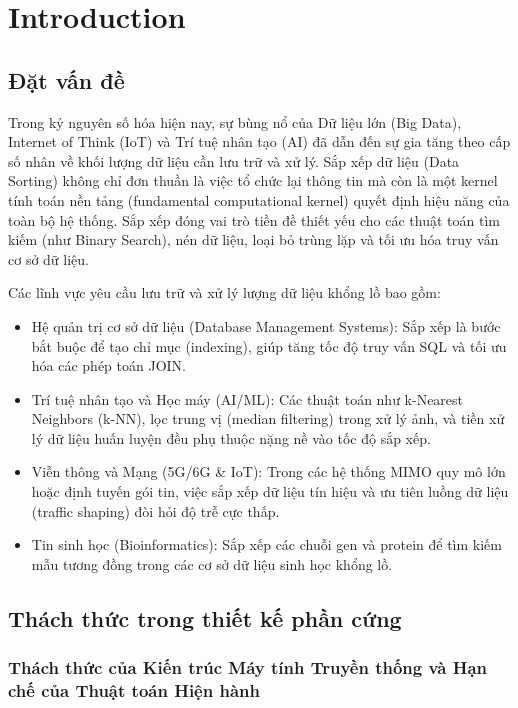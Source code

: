 \section{Introduction}

\subsection{Đặt vấn đề}

Trong kỷ nguyên số hóa hiện nay, sự bùng nổ của Dữ liệu lớn (Big Data), Internet of Think (IoT) và Trí tuệ nhân tạo (AI) đã dẫn đến sự gia tăng theo cấp số nhân về khối lượng dữ liệu cần lưu trữ và xử lý. Sắp xếp dữ liệu (Data Sorting) không chỉ đơn thuần là việc tổ chức lại thông tin mà còn là một kernel tính toán nền tảng (fundamental computational kernel) quyết định hiệu năng của toàn bộ hệ thống. Sắp xếp đóng vai trò tiền đề thiết yếu cho các thuật toán tìm kiếm (như Binary Search), nén dữ liệu, loại bỏ trùng lặp và tối ưu hóa truy vấn cơ sở dữ liệu.

Các lĩnh vực yêu cầu lưu trữ và xử lý lượng dữ liệu khổng lồ bao gồm:
\begin{itemize}[label=-]
	\item Hệ quản trị cơ sở dữ liệu (Database Management Systems): Sắp xếp là bước bắt buộc để tạo chỉ mục (indexing), giúp tăng tốc độ truy vấn SQL và tối ưu hóa các phép toán JOIN.
	
	\item Trí tuệ nhân tạo và Học máy (AI/ML): Các thuật toán như k-Nearest Neighbors (k-NN), lọc trung vị (median filtering) trong xử lý ảnh, và tiền xử lý dữ liệu huấn luyện đều phụ thuộc nặng nề vào tốc độ sắp xếp.
	
	\item Viễn thông và Mạng (5G/6G \& IoT): Trong các hệ thống MIMO quy mô lớn hoặc định tuyến gói tin, việc sắp xếp dữ liệu tín hiệu và ưu tiên luồng dữ liệu (traffic shaping) đòi hỏi độ trễ cực thấp.
	
	\item Tin sinh học (Bioinformatics): Sắp xếp các chuỗi gen và protein để tìm kiếm mẫu tương đồng trong các cơ sở dữ liệu sinh học khổng lồ.
\end{itemize}

\subsection{Thách thức trong thiết kế phần cứng}

\subsubsection{Thách thức của Kiến trúc Máy tính Truyền thống và Hạn chế của Thuật toán Hiện hành}


